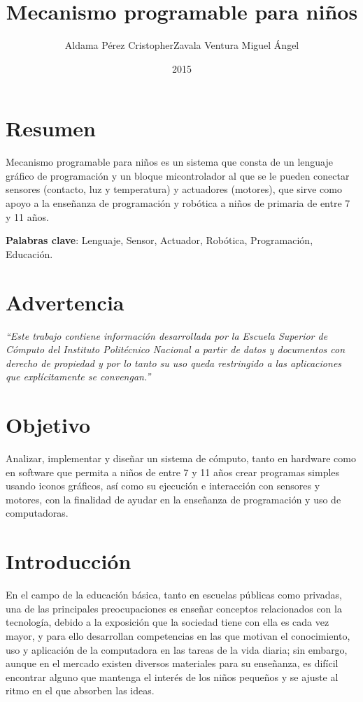 \documentclass[letterpaper,10pt]{article}
\title{Mecanismo programable para niños}
\author{Aldama Pérez Cristopher\newline Zavala Ventura Miguel Ángel }
\date{2015}
\begin{document}
\maketitle
{}
\newpage
{}

\section{Resumen}

Mecanismo programable para niños es un sistema que consta de un lenguaje gráfico 
de programación y un bloque micontrolador al que se le pueden conectar sensores 
(contacto, luz y temperatura) y actuadores (motores), que sirve como apoyo a la 
enseñanza de programación y robótica a niños de primaria de entre 7 y 11 años.\newline

\textbf{Palabras clave}: Lenguaje, Sensor, Actuador, Robótica, Programación, Educación.

\newpage
\section{Advertencia}
\textit{``Este trabajo contiene información desarrollada por la Escuela
 Superior de Cómputo del Instituto Politécnico Nacional a partir de datos y documentos
  con derecho de propiedad y por lo tanto su uso queda restringido a las 
  aplicaciones que explícitamente se convengan.''}

\newpage  
\tableofcontents
\newpage
  
\newpage
\section{Objetivo}

Analizar, implementar y diseñar un sistema de cómputo, tanto en hardware como
en software que permita a niños de entre 7 y 11 años crear programas simples
usando iconos gráficos, así como su ejecución e interacción con sensores y motores,
con la finalidad de ayudar en la enseñanza de programación y uso de computadoras.

\newpage
\section{Introducción}

En el campo de la educación básica, tanto en escuelas públicas como privadas, 
una de las principales preocupaciones es enseñar conceptos relacionados 
con la tecnología, debido a la exposición que la sociedad tiene 
con ella es cada vez mayor, y para ello desarrollan competencias en las 
que motivan el conocimiento, uso y aplicación de la computadora en las tareas 
de la vida diaria; sin embargo, aunque en el mercado existen diversos materiales 
para su enseñanza, es difícil encontrar alguno que mantenga el interés de los niños 
pequeños y se ajuste al ritmo en el que absorben las ideas.
\newline
\end{document}
